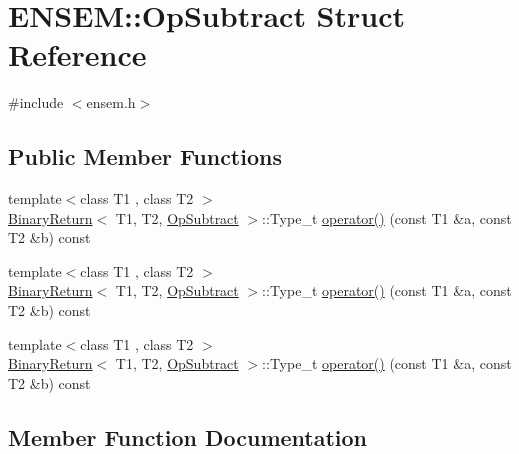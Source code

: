 \hypertarget{structENSEM_1_1OpSubtract}{}\section{E\+N\+S\+EM\+:\+:Op\+Subtract Struct Reference}
\label{structENSEM_1_1OpSubtract}


{\ttfamily \#include $<$ensem.\+h$>$}

\subsection*{Public Member Functions}
\begin{DoxyCompactItemize}
\item 
{\footnotesize template$<$class T1 , class T2 $>$ }\\\mbox{\hyperlink{structENSEM_1_1BinaryReturn}{Binary\+Return}}$<$ T1, T2, \mbox{\hyperlink{structENSEM_1_1OpSubtract}{Op\+Subtract}} $>$\+::Type\+\_\+t \mbox{\hyperlink{structENSEM_1_1OpSubtract_ac246484950e9df9cb101370fd5f7f6b0}{operator()}} (const T1 \&a, const T2 \&b) const
\item 
{\footnotesize template$<$class T1 , class T2 $>$ }\\\mbox{\hyperlink{structENSEM_1_1BinaryReturn}{Binary\+Return}}$<$ T1, T2, \mbox{\hyperlink{structENSEM_1_1OpSubtract}{Op\+Subtract}} $>$\+::Type\+\_\+t \mbox{\hyperlink{structENSEM_1_1OpSubtract_ac246484950e9df9cb101370fd5f7f6b0}{operator()}} (const T1 \&a, const T2 \&b) const
\item 
{\footnotesize template$<$class T1 , class T2 $>$ }\\\mbox{\hyperlink{structENSEM_1_1BinaryReturn}{Binary\+Return}}$<$ T1, T2, \mbox{\hyperlink{structENSEM_1_1OpSubtract}{Op\+Subtract}} $>$\+::Type\+\_\+t \mbox{\hyperlink{structENSEM_1_1OpSubtract_ac246484950e9df9cb101370fd5f7f6b0}{operator()}} (const T1 \&a, const T2 \&b) const
\end{DoxyCompactItemize}


\subsection{Member Function Documentation}
\mbox{\label{structENSEM_1_1OpSubtract_ac246484950e9df9cb101370fd5f7f6b0}} 
